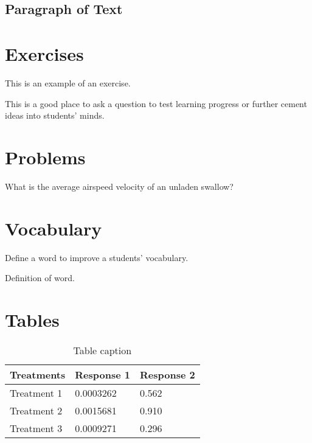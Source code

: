 \subsection{Paragraph of Text}

\begin{example}
\lipsum[2]
\end{example}


\section{Exercises}

This is an example of an exercise.

\begin{exercise}
This is a good place to ask a question to test learning progress or further cement ideas into students' minds.
\end{exercise}


\section{Problems}

\begin{problem}
What is the average airspeed velocity of an unladen swallow?
\end{problem}


\section{Vocabulary}

Define a word to improve a students' vocabulary.

\begin{vocabulary}[Word]
Definition of word.
\end{vocabulary}

\section{Tables}

\begin{table}[h]
\centering
\begin{tabular}{l l l}
\toprule
\textbf{Treatments} & \textbf{Response 1} & \textbf{Response 2}\\
\midrule
Treatment 1 & 0.0003262 & 0.562 \\
Treatment 2 & 0.0015681 & 0.910 \\
Treatment 3 & 0.0009271 & 0.296 \\
\bottomrule
\end{tabular}
\caption{Table caption}
\end{table}

